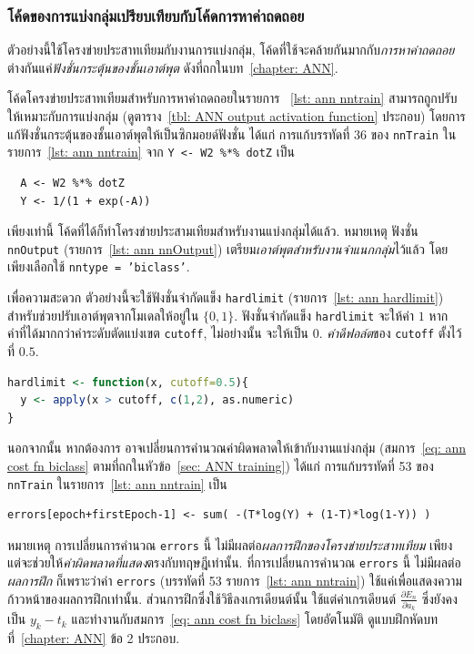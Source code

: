 \subsubsection{โค้ดของการแบ่งกลุ่มเปรียบเทียบกับโค้ดการหาค่าถดถอย}

ตัวอย่างนี้ใช้โครงข่ายประสาทเทียมกับงานการแบ่งกลุ่ม, 
โค้ดที่ใช้จะคล้ายกันมากกับ\textit{การหาค่าถดถอย} 
ต่างกันแค่\textit{ฟังชั่นกระตุ้นของชั้นเอาต์พุต} ดังที่ถกในบท~\ref{chapter: ANN}.

โค้ดโครงข่ายประสาทเทียมสำหรับการหาค่าถดถอยในรายการ
~\ref{lst: ann nntrain} สามารถถูกปรับให้เหมาะกับการแบ่งกลุ่ม (ดูตาราง~\ref{tbl: ANN output activation function} ประกอบ) โดยการแก้ฟังชั่นกระตุ้นของชั้นเอาต์พุตให้เป็นซิกมอยด์ฟังชั่น 
ได้แก่
การแก้บรรทัดที่ 36 ของ \texttt{nnTrain} ใน รายการ~\ref{lst: ann nntrain}
จาก \texttt{Y <- W2 \%*\% dotZ} เป็น
\begin{verbatim}
  A <- W2 %*% dotZ
  Y <- 1/(1 + exp(-A))
\end{verbatim}
เพียงเท่านี้ โค้ดที่ได้ก็ทำโครงข่ายประสามเทียมสำหรับงานแบ่งกลุ่มได้แล้ว.
หมายเหตุ ฟังชั่น \texttt{nnOutput} (รายการ~\ref{lst: ann nnOutput}) เตรียม\textit{เอาต์พุตสำหรับงานจำแนกกลุ่ม}ไว้แล้ว โดยเพียงเลือกใช้ \texttt{nntype = 'biclass'}.

เพื่อความสะดวก ตัวอย่างนี้จะใช้ฟังชั่นจำกัดแข็ง \texttt{hardlimit} (รายการ~\ref{lst: ann hardlimit})
สำหรับช่วยปรับเอาต์พุตจากโมเดลให้อยู่ใน $\{0,1\}$.
ฟังชั่นจำกัดแข็ง \texttt{hardlimit} จะให้ค่า $1$ หากค่าที่ได้มากกว่าค่าระดับตัดแบ่งเขต \texttt{cutoff},
ไม่อย่างนั้น จะให้เป็น $0$.
\textit{ค่าดีฟอล์ต}ของ \texttt{cutoff} ตั้งไว้ที่ $0.5$.

\begin{lstlisting}[language=R,caption={ฟังชั่นจำกัดแข็ง \texttt{hardlimit} เพื่อช่วยจัดการเอาต์พุตสุดท้ายสำหรับการแบ่งกลุ่ม},label={lst: ann hardlimit}]
hardlimit <- function(x, cutoff=0.5){
  y <- apply(x > cutoff, c(1,2), as.numeric)
}
\end{lstlisting}

นอกจากนั้น หากต้องการ อาจเปลี่ยนการคำนวณค่าผิดพลาดให้เข้ากับงานแบ่งกลุ่ม (สมการ~\ref{eq: ann cost fn biclass} ตามที่ถกในหัวข้อ~\ref{sec: ANN training}) ได้แก่ การแก้บรรทัดที่ 53 ของ \texttt{nnTrain} ในรายการ~\ref{lst: ann nntrain}
เป็น
\begin{verbatim}
errors[epoch+firstEpoch-1] <- sum( -(T*log(Y) + (1-T)*log(1-Y)) )
\end{verbatim}
หมายเหตุ การเปลี่ยนการคำนวณ \texttt{errors} นี้ ไม่มีผลต่อ\textit{ผลการฝึกของโครงข่ายประสาทเทียม} เพียงแต่จะช่วยให้\textit{ค่าผิดพลาดที่แสดง}ตรงกับทฤษฎีเท่านั้น.
ที่การเปลี่ยนการคำนวณ \texttt{errors} นี้ ไม่มีผลต่อ\textit{ผลการฝึก} 
ก็เพราะว่าค่า \texttt{errors} (บรรทัดที่ 53 รายการ~\ref{lst: ann nntrain}) ใช้แค่เพื่อแสดงความก้าวหน้าของผลการฝึกเท่านั้น.
%
ส่วนการฝึกซึ่งใช้วิธีลงเกรเดียนต์นั้น 
ใช้แต่ค่าเกรเดียนต์ $\frac{\partial E_n}{\partial a_k}$ ซึ่งยังคงเป็น $y_k - t_k$
และทำงานกับสมการ~\ref{eq: ann cost fn biclass} โดยอัตโนมัติ 
ดูแบบฝึกหัดบทที่~\ref{chapter: ANN} ข้อ 2 ประกอบ.

